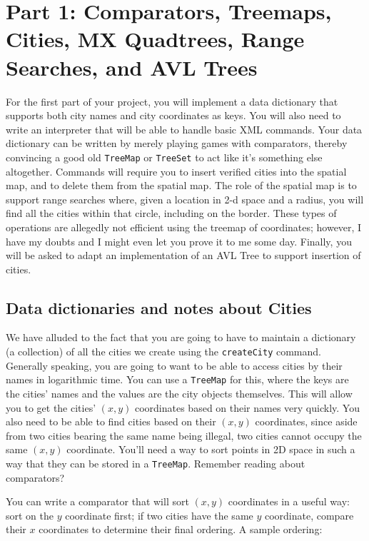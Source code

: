 \documentclass[12pt]{article}
\begin{document}
\section{Part 1: Comparators, Treemaps, Cities, MX Quadtrees, Range Searches, and AVL Trees}
For the first part of your project, you will implement a data
dictionary that supports both city names and city coordinates as keys.   
You will also need to write an interpreter
that will be able to handle basic XML commands.  
 Your data dictionary can be written by merely playing
games with comparators, thereby convincing a good old \texttt{TreeMap}
or \texttt{TreeSet} to act like it's something else altogether.
Commands will require you to insert verified cities into the
spatial map, and to delete them from the spatial map. The role of the
spatial map is to support range searches where, given a location in
2-d space and a radius, you will find all the cities  within that
circle, including on the border. These types of operations
are allegedly not efficient using the treemap of coordinates; however,
I have my doubts  and I might even let you prove it to me some day. Finally, you will be asked to adapt an implementation of an AVL Tree to support insertion of cities.

\subsection{Data dictionaries and notes about Cities}\label{comparator}

We have alluded to the fact that you are going to have to maintain a
dictionary (a collection) of all the cities we create using the
\texttt{createCity} command.  Generally speaking, you are going to want
to be able to access cities by their names in logarithmic time.  You can
use a \texttt{TreeMap} for this, where the keys are the cities' names
and the values are the city objects themselves.  This will allow you to
get the cities' $(x,y)$ coordinates based on their names very quickly.
You also need to be able to find cities based on their $(x,y)$
coordinates, since aside from two cities bearing the same name being
illegal, two cities cannot occupy the same $(x,y)$ coordinate.  You'll
need a way to sort points in 2D space in such a way that they can be
stored in a \texttt{TreeMap}.  Remember reading about comparators?


You can write a comparator that will sort $(x,y)$ coordinates in a
useful way: sort on the $y$ coordinate first; if two cities have the
same $y$ coordinate, compare their $x$ coordinates to determine their
final ordering.  A sample ordering:
\end{document}
